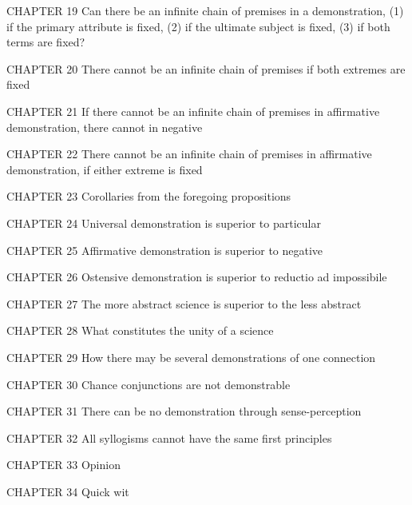 CHAPTER 19
Can there be an infinite chain of premises in a demonstration,
(1) if the primary attribute is fixed, (2) if the ultimate subject is fixed,
(3) if both terms are fixed?

CHAPTER 20
There cannot be an infinite chain of premises if both extremes
are fixed

CHAPTER 21
If there cannot be an infinite chain of premises in affirmative
demonstration, there cannot in negative

CHAPTER 22
There cannot be an infinite chain of premises in affirmative
demonstration, if either extreme is fixed

CHAPTER 23
Corollaries from the foregoing propositions

CHAPTER 24
Universal demonstration is superior to particular

CHAPTER 25
Affirmative demonstration is superior to negative

CHAPTER 26
Ostensive demonstration is superior to reductio ad impossibile

CHAPTER 27
The more abstract science is superior to the less abstract

CHAPTER 28
What constitutes the unity of a science

CHAPTER 29
How there may be several demonstrations of one connection

CHAPTER 30
Chance conjunctions are not demonstrable

CHAPTER 31
There can be no demonstration through sense-perception

CHAPTER 32
All syllogisms cannot have the same first principles

CHAPTER 33
Opinion

CHAPTER 34
Quick wit
